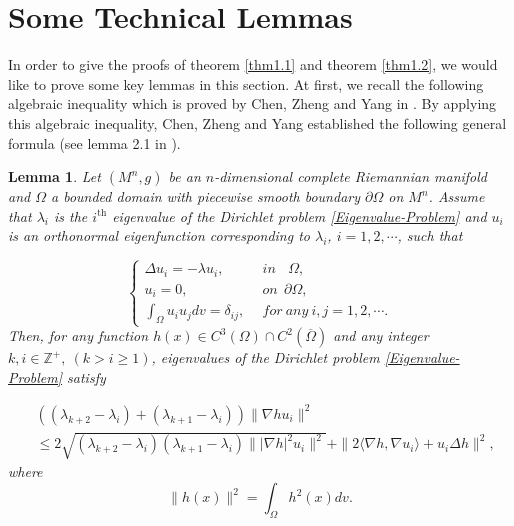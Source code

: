 \documentclass[12pt]{article}
\newtheorem{lem}[thm]{Lemma}
\numberwithin{equation}{section}
\begin{document}
\vskip5mm


\section{Some Technical Lemmas}\label{sec2}
\vskip3mm


In order to give the proofs of theorem \ref{thm1.1} and theorem \ref{thm1.2}, we would like to prove some key lemmas in this section. At first, we recall
the following algebraic inequality which is proved by Chen, Zheng and Yang in \cite{CZY}. By applying this algebraic inequality, Chen, Zheng and Yang established
the following general formula (see lemma 2.1 in \cite{CZY}).

\begin{lem}\label{lem2.1}
Let $(M^{n},g)$ be an $n$-dimensional complete Riemannian manifold and $\Omega$ a bounded domain
with piecewise smooth boundary $\partial\Omega$ on $M^{n}$.
Assume that $\lambda_{i}$  is  the $i^{\text{th}}$ eigenvalue of the
Dirichlet problem \eqref{Eigenvalue-Problem}  and $u_{i}$ is an
orthonormal eigenfunction corresponding to $\lambda_{i}$, $i =
1,2,\cdots$, such that

\begin{equation*}
\left\{ \begin{aligned}\Delta u_{i}=-\lambda u_{i},\ \ \ \ \ \ \ &
in\ \ \ \ \Omega,
         \\ u_{i}=0,\ \ \ \ \ \ \ \ \ \ \ \ \ \ &  on\ \ \partial\Omega,
\\
\int_{\Omega}
u_{i}u_{j}dv=\delta_{ij},\ \ & for~any  \ i,j=1,2,\cdots.
                          \end{aligned} \right.
                          \end{equation*}
Then, for any function $h(x)\in C^{3}(\Omega)\cap C^{2}(\overline{\Omega})$ and any
integer $k,i \in \mathbb{Z}^{+},~(k>i\geq1)$,  eigenvalues of the Dirichlet problem \eqref{Eigenvalue-Problem} satisfy


\begin{equation}\begin{aligned}\label{general-formula-1}&((\lambda_{k+2}-\lambda_{i})+(\lambda_{k+1}-\lambda_{i}))\|\nabla hu_{i}\|^{2}
\\&\leq2\sqrt{(\lambda_{k+2}-\lambda_{i})(\lambda_{k+1}-\lambda_{i})\||\nabla h|^{2}u_{i}\|^{2}}
+\|2\langle\nabla h,\nabla u_{i}\rangle+u_{i}\Delta h\|^{2},
\end{aligned}\end{equation}
where
\begin{equation*}
\|h(x)\|^{2} =\int_{\Omega}h^{2}(x)dv.
\end{equation*}
\end{lem}
\end{document}
